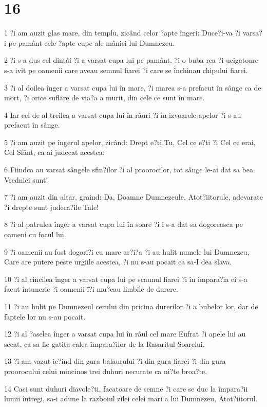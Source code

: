 \chapter{16}

\par 1 ?i am auzit glas mare, din templu, zicând celor ?apte îngeri: Duce?i-va ?i varsa?i pe pamânt cele ?apte cupe ale mâniei lui Dumnezeu.
\par 2 ?i s-a dus cel dintâi ?i a varsat cupa lui pe pamânt. ?i o buba rea ?i ucigatoare s-a ivit pe oamenii care aveau semnul fiarei ?i care se închinau chipului fiarei.
\par 3 ?i al doilea înger a varsat cupa lui în mare, ?i marea s-a prefacut în sânge ca de mort, ?i orice suflare de via?a a murit, din cele ce sunt în mare.
\par 4 Iar cel de al treilea a varsat cupa lui în râuri ?i în izvoarele apelor ?i s-au prefacut în sânge.
\par 5 ?i am auzit pe îngerul apelor, zicând: Drept e?ti Tu, Cel ce e?ti ?i Cel ce erai, Cel Sfânt, ca ai judecat acestea:
\par 6 Fiindca au varsat sângele sfin?ilor ?i al proorocilor, tot sânge le-ai dat sa bea. Vrednici sunt!
\par 7 ?i am auzit din altar, graind: Da, Doamne Dumnezeule, Atot?iitorule, adevarate ?i drepte sunt judeca?ile Tale!
\par 8 ?i al patrulea înger a varsat cupa lui în soare ?i i s-a dat sa dogoreasca pe oameni cu focul lui.
\par 9 ?i oamenii au fost dogori?i cu mare ar?i?a ?i au hulit numele lui Dumnezeu, Care are putere peste urgiile acestea, ?i nu s-au pocait ca sa-I dea slava.
\par 10 ?i al cincilea înger a varsat cupa lui pe scaunul fiarei ?i în împara?ia ei s-a facut întuneric ?i oamenii î?i mu?cau limbile de durere.
\par 11 ?i au hulit pe Dumnezeul cerului din pricina durerilor ?i a bubelor lor, dar de faptele lor nu s-au pocait.
\par 12 ?i al ?aselea înger a varsat cupa lui în râul cel mare Eufrat ?i apele lui au secat, ca sa fie gatita calea împara?ilor de la Rasaritul Soarelui.
\par 13 ?i am vazut ie?ind din gura balaurului ?i din gura fiarei ?i din gura proorocului celui mincinos trei duhuri necurate ca ni?te broa?te.
\par 14 Caci sunt duhuri diavole?ti, facatoare de semne ?i care se duc la împara?ii lumii întregi, sa-i adune la razboiul zilei celei mari a lui Dumnezeu, Atot?iitorul.
